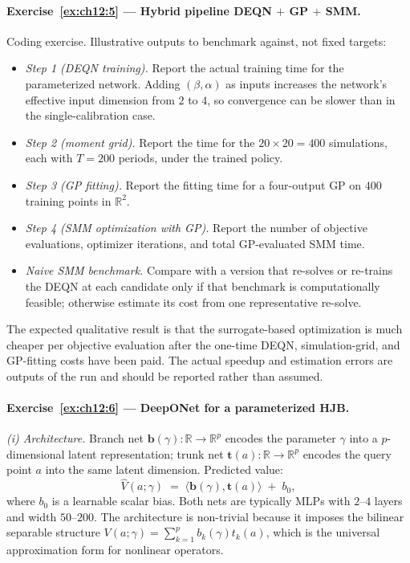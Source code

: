 \documentclass[11pt,a4paper]{report}
\begin{document}
\paragraph{Exercise~\ref{ex:ch12:5} --- Hybrid pipeline DEQN $+$ GP $+$ SMM.}
Coding exercise.  Illustrative outputs to benchmark against, not fixed targets:
\begin{itemize}[itemsep=2pt]
\item \emph{Step 1 (DEQN training).} Report the actual training time for the parameterized network.  Adding $(\beta,\alpha)$ as inputs increases the network's effective input dimension from $2$ to $4$, so convergence can be slower than in the single-calibration case.
\item \emph{Step 2 (moment grid).}  Report the time for the $20\times 20=400$ simulations, each with $T=200$ periods, under the trained policy.
\item \emph{Step 3 (GP fitting).}  Report the fitting time for a four-output GP on $400$ training points in $\mathbb{R}^2$.
\item \emph{Step 4 (SMM optimization with GP).}  Report the number of objective evaluations, optimizer iterations, and total GP-evaluated SMM time.
\item \emph{Naive SMM benchmark.}  Compare with a version that re-solves or re-trains the DEQN at each candidate only if that benchmark is computationally feasible; otherwise estimate its cost from one representative re-solve.
\end{itemize}
The expected qualitative result is that the surrogate-based optimization is much cheaper per objective evaluation after the one-time DEQN, simulation-grid, and GP-fitting costs have been paid.  The actual speedup and estimation errors are outputs of the run and should be reported rather than assumed.

\paragraph{Exercise~\ref{ex:ch12:6} --- DeepONet for a parameterized HJB.}
\emph{(i) Architecture.}  Branch net $\bm b(\gamma): \mathbb{R} \to \mathbb{R}^p$ encodes the parameter $\gamma$ into a $p$-dimensional latent representation; trunk net $\bm t(a): \mathbb{R} \to \mathbb{R}^p$ encodes the query point $a$ into the same latent dimension.  Predicted value:
\[
   \widehat{V}(a; \gamma) \;=\; \langle \bm b(\gamma), \bm t(a)\rangle \;+\; b_0,
\]
where $b_0$ is a learnable scalar bias.  Both nets are typically MLPs with $2$--$4$ layers and width $50$--$200$.  The architecture is non-trivial because it imposes the bilinear separable structure $V(a; \gamma) = \sum_{k=1}^p b_k(\gamma) t_k(a)$, which is the universal approximation form for nonlinear operators.
\end{document}
